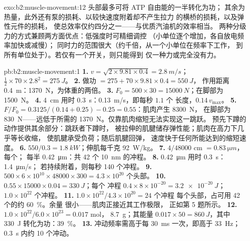 \begin{solution}{exo:b2:muscle-movement:12}
头部最多可将 ATP 自由能的一半转化为功；
其余为热量，此外还有泵的损耗、以较快速度附着却不产生拉力
的横桥的损耗，以及弹性元件的损耗，
使总效率仅约四分之一——与优质汽油机的效率相当。
两种分级力的方式兼顾两方面优点：低强度时可精细调控
（小单位逐个增加，各自放电频率加快或减慢）；
同时力的范围很大（约千倍，从一个小单位在频率下工作，
到所有单位处于）。若仅有一个开关，则只能得到
仅一种力或完全没有力。
\end{solution}

\begin{solution}{pb:b2:muscle-movement:1}
\textbf{1.} $v = \sqrt{2\times 9.81\times 0.4} = \qty{2.8}{m/s}$；
$\tfrac12\times 70\times 2.8^{2} = \qty{275}{J}$。
\textbf{2.} 做功 $= 275 + 70\times 9.81\times 0.4 = \qty{550}{J}$，
作用距离 \qty{0.4}{m}：\qty{1370}{N}，为体重的两倍。
\textbf{3.} $F_0 = 500\times 30 = \qty{15000}{N}$；在脚部为
\qty{1500}{N}。
\textbf{4.} \qty{4}{cm} 用时 \qty{0.3}{s}：\qty{0.13}{m/s}，即每秒 $1.1$ 个
长度，$0.14\,v_{\max}$。
\textbf{5.} $F/F_0 = 0.3125/(0.14 + 0.25) - 0.25 = 0.55$：肌肉产生 \qty{8300}{N}，
在脚部为 \qty{830}{N}——远低于所需的
\qty{1370}{N}。仅靠肌肉缩短无法实现这一跳跃。
预先下蹲的动作提供其余部分：跳跃者下蹲时，
被拉伸的肌腱储存弹性能；肌肉在高力下几乎等长收缩，
使肌腱承受负荷；随后肌腱回弹，
速度快于任何所能达到的缩短速度。
\textbf{6.} $550/0.3 = \qty{1.8}{kW}$；伸肌每千克 \qty{92}{W/kg}。
\textbf{7.} $4/\num{48000}$ cm $= \qty{0.83}{\micro m}$，每个；
每半 \qty{0.42}{\micro m}：共 42 个 \qty{10}{nm} 的冲程。
\textbf{8.} \qty{0.42}{\micro m} 用时 \qty{0.3}{s}：\qty{1.4}{\micro m/s}；
若持续附着，则每秒 140 个冲程。
\textbf{9.} $500\times 6\times 10^{10}\times \num{48000}\times 300 =
4.3\times 10^{20}$ 个头部。
\textbf{10.} $0.55\times \num{15000}\times 0.04 = \qty{330}{J}$；每个
冲程 $0.4\times 8\times 10^{-20} = \qty{3.2e-20}{J}$；$1.0\times
10^{22}$ 个冲程。
\textbf{11.} $1.0\times 10^{22}/4.3\times 10^{20} = 24$ 个冲程
每个头部，占可用 42 个的约 \qty{60}{\%}。余量
很小——肌肉正接近其工作极限，
正如第 5 题所示。
\textbf{12.} $1.0\times 10^{22}/6.0\times 10^{23} = 0.017$ mol，
\qty{8.7}{g}；其能量 $0.017\times 50 = \qty{860}{J}$，其中
\qty{330}{J} 转化为功：\qty{39}{\%}。
\textbf{13.} 冲动频率需高于每 \qty{30}{ms} 一次，即高于
\qty{33}{Hz}；\qty{0.3}{s} 内约 10 个冲动。

\end{solution}
